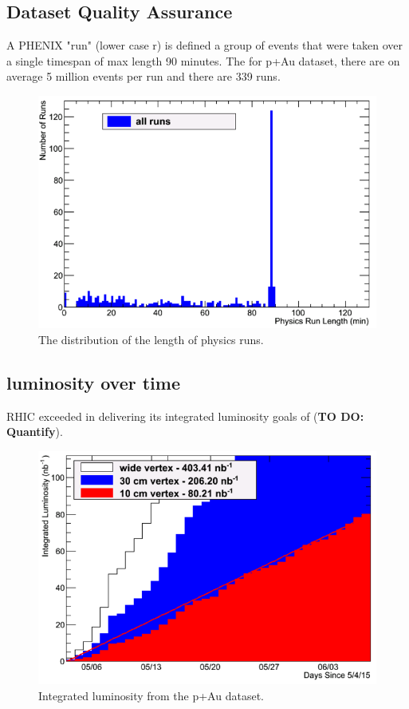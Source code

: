 \subsection{Dataset Quality Assurance}
A PHENIX "run" (lower case r) is defined a group of events that were taken over a single timespan of max length 90 minutes. The for p+Au dataset, there are on 
average 5 million events per run and there are 339 runs. 
\begin{figure}[!h]
\begin{center}
\includegraphics[width=0.65\linewidth]{figs/hruntime.png}
\caption{The distribution of the length of physics runs.}
\end{center}
\end{figure}
\subsection{luminosity over time}
RHIC exceeded in delivering its integrated luminosity goals of (\textbf{TO DO: Quantify}).
\begin{figure}[!h]
\begin{center}
\includegraphics[width=0.65\linewidth]{figs/integrated_luminosity.png}
\caption{Integrated luminosity from the p+Au dataset.}
\end{center}
\end{figure}
